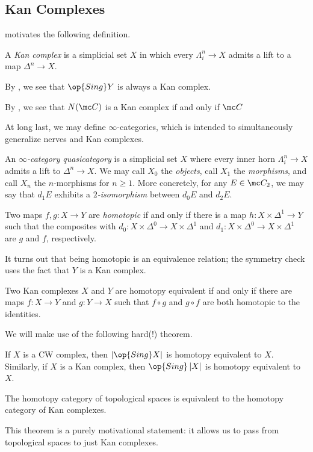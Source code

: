 \documentclass[../notes.tex]{subfiles}
\begin{document}
\subsection{Kan Complexes}
 motivates the following definition.
\begin{definition}
	A \textit{Kan complex} is a simplicial set $X$ in which every $\Lambda^n_i\to X$ admits a lift to a map $\Delta^n\to X$.
\end{definition}
\begin{example}
	By , we see that $\op{Sing}Y$ is always a Kan complex.
\end{example}
\begin{example}
	By , we see that $N(\mc C)$ is a Kan complex if and only if $\mc C$
\end{example}
At long last, we may define $\infty$-categories, which is intended to simultaneously generalize nerves and Kan complexes.
\begin{defihelper}  
	An \textit{$\infty$-category} \textit{quasicategory} is a simplicial set $X$ where every inner horn $\Lambda^n_i\to X$ admits a lift to $\Delta^n\to X$. We may call $X_0$ the \textit{objects}, call $X_1$ the \textit{morphisms}, and call $X_n$ the $n$-morphisms for $n\ge1$. More concretely, for any $E\in\mc C_2$, we may say that $d_1E$ exhibits a \textit{$2$-isomorphism} between $d_0E$ and $d_2E$.
\end{defihelper}
\begin{definition}[homotopic]
	Two maps $f,g\colon X\to Y$ are \textit{homotopic} if and only if there is a map $h\colon X\times\Delta^1\to Y$ such that the composites with $d_0\colon X\times\Delta^0\to X\times\Delta^1$ and $d_1\colon X\times\Delta^0\to X\times\Delta^1$ are $g$ and $f$, respectively.
\end{definition}
\begin{remark}
	It turns out that being homotopic is an equivalence relation; the symmetry check uses the fact that $Y$ is a Kan complex.
\end{remark}
\begin{definition}
	Two Kan complexes $X$ and $Y$ are homotopy equivalent if and only if there are maps $f\colon X\to Y$ and $g\colon Y\to X$ such that $f\circ g$ and $g\circ f$ are both homotopic to the identities.
\end{definition}
We will make use of the following hard(!) theorem.
\begin{theorem}[Quillen]
	If $X$ is a CW complex, then $\left|\op{Sing}X\right|$ is homotopy equivalent to $X$. Similarly, if $X$ is a Kan complex, then $\op{Sing}\left|X\right|$ is homotopy equivalent to $X$.
\end{theorem}
\begin{corollary}
	The homotopy category of topological spaces is equivalent to the homotopy category of Kan complexes.
\end{corollary}
This theorem is a purely motivational statement: it allows us to pass from topological spaces to just Kan complexes.
\end{document}

